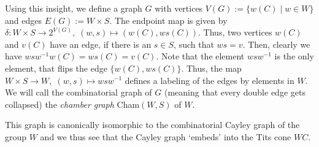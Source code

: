 Using this insight, we define a graph \(G\) with vertices \(V(G) := \{w(C) \;\vert\; w \in W\}\) and edges \(E(G) := W \times S\).
The endpoint map is given by \(\delta : W \times S \to 2^{V(G)},\; (w, s) \mapsto (w(C), ws(C))\).
Thus, two vertices \(w(C)\) and \(v(C)\) have an edge, if there is an \(s \in S\), such that \(ws = v\).
Then, clearly we have \(wsw^{-1}w(C) = ws(C) = v(C)\).
Note that the element \(wsw^{-1}\) is the only element, that flips the edge \(\{w(C), ws(C)\}\).
Thus, the map \(W \times S \to W, \; (w, s) \mapsto wsw^{-1}\) defines a labeling of the edges by elements in \(W\).
We will call the combinatorial graph of \(G\) (meaning that every double edge gets collapsed) the \emph{chamber graph} Cham\((W, S)\) of \(W\).


This graph is canonically isomorphic to the combinatorial Cayley graph of the group \(W\) and we thus see that the Cayley graph `embeds' into the Tits cone \(WC\).

